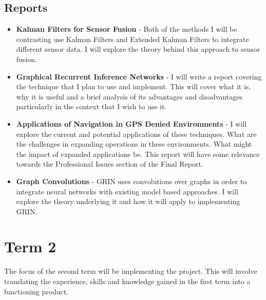 \documentclass[]{../resources/final_report}
\begin{document}
\subsection{Reports}
\begin{itemize}
  \item \textbf{Kalman Filters for Sensor Fusion} - Both of the methods I will be contrasting use Kalman Filters and Extended Kalman Filters to integrate different sensor data. I will explore the theory behind this approach to sensor fusion.
  \item \textbf{Graphical Recurrent Inference Networks} - I will write a report covering the technique that I plan to use and implement. This will cover what it is, why it is useful and a brief analysis of its advantages and disadvantages particularly in the context that I wish to use it.
  \item \textbf{Applications of Navigation in GPS Denied Environments} - I will explore the current and potential applications of these techniques. What are the challenges in expanding operations in these environments. What might the impact of expanded applications be. This report will have some relevance towards the Professional Issues section of the Final Report.
  \item \textbf{Graph Convolutions} - GRIN uses convolutions over graphs in order to integrate neural networks with existing model based approaches. I will explore the theory underlying it and how it will apply to implementing GRIN.
\end{itemize}

\section{Term 2}

The focus of the second term will be implementing the project. This will involve translating the experience, skills and knowledge gained in the first term into a functioning product.
\end{document}

